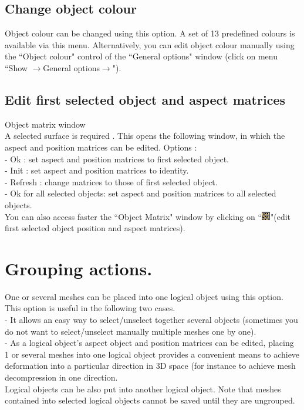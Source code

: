 \subsection{Change object colour}
Object colour can be changed using this option. A set of 13 predefined colours is available via this menu. Alternatively, you can edit object colour manually using the ``Object colour" control of the ``General options" window (click on menu ``Show $\rightarrow$General options$\rightarrow$").

\subsection{Edit first selected object and aspect matrices}
Object matrix window\\

A selected surface is required . This opens the following window,
in which the aspect and position matrices can be edited.
Options :\\
- Ok : set aspect and position matrices to first selected object.\\
- Init : set aspect and position matrices to identity.\\
- Refresh : change matrices to those of first selected object.\\
- Ok for all selected objects: set aspect and position matrices to
all selected objects.\\
You can also access faster the ``Object Matrix" window by clicking
on ``\includegraphics[scale=0.7]{images/pixmap/mat.png}"(edit first selected object position and aspect matrices).

\section{Grouping actions.}
One or several meshes can be placed into one logical object using this option. This option is useful in the following two cases.\\
- It allows an easy way to select/unselect together several objects (sometimes you do not want
to select/unselect manually multiple meshes one by one).\\
- As a logical object’s aspect object and position matrices can be edited, placing 1 or several
meshes into one logical object provides a convenient means to achieve deformation into
a particular direction in 3D space (for instance to achieve mesh decompression in one
direction.\\
Logical objects can be also put into another logical object. Note that meshes contained into selected logical objects cannot be saved until they are ungrouped.

